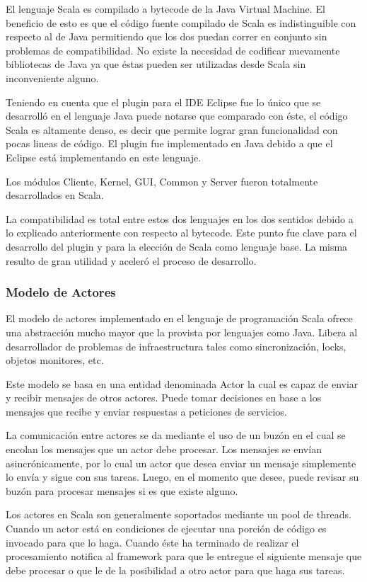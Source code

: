 \documentclass[12pt,a4paper]{article}
\begin{document}
El lenguaje Scala es compilado a bytecode de la Java Virtual Machine. El beneficio de esto es que el código fuente
compilado de Scala es indistinguible con respecto al de Java permitiendo que los dos puedan correr en conjunto
sin problemas de compatibilidad. No existe la necesidad de codificar nuevamente bibliotecas de Java
ya que éstas pueden ser utilizadas desde Scala sin inconveniente alguno.

Teniendo en cuenta que el plugin para el IDE Eclipse fue lo único que se desarrolló en el lenguaje Java puede
notarse que comparado con éste, el código Scala es altamente denso, es decir que permite lograr gran funcionalidad 
con pocas lineas de código. El plugin fue implementado en Java debido a que el Eclipse está
implementando en este lenguaje.

Los módulos Cliente, Kernel, GUI, Common y Server fueron totalmente desarrollados en Scala.

La compatibilidad es total entre estos dos lenguajes en los dos sentidos debido a lo explicado anteriormente con
respecto al bytecode.
Este punto fue clave para el desarrollo del plugin y para la elección de Scala como lenguaje base. La misma 
resulto de gran utilidad y aceleró el proceso de desarrollo.

\subsubsection{Modelo de Actores}

El modelo de actores implementado en el lenguaje de programación Scala ofrece una abstracción mucho mayor que
la provista por lenguajes como Java. Libera al desarrollador de problemas de infraestructura tales como sincronización,
locks, objetos monitores, etc.

Este modelo se basa en una entidad denominada Actor la cual es capaz de enviar y recibir mensajes de otros actores.
Puede tomar decisiones en base a los mensajes que recibe y enviar respuestas a peticiones de servicios. 

La comunicación entre actores se da mediante el uso de un buzón en el cual se encolan los mensajes que un actor
debe procesar. Los mensajes se envían asincrónicamente, por lo cual un actor que desea enviar un mensaje
simplemente lo envía y sigue con sus tareas. Luego, en el momento que desee, puede revisar su buzón para 
procesar mensajes si es que existe alguno.

Los actores en Scala son generalmente soportados mediante un pool de threads. Cuando un actor está en condiciones de ejecutar
una porción de código es invocado para que lo haga. Cuando éste ha terminado de realizar el procesamiento notifica
al framework para que le entregue el siguiente mensaje que debe procesar o que le de la posibilidad a otro actor
para que haga sus tareas.
\end{document}
